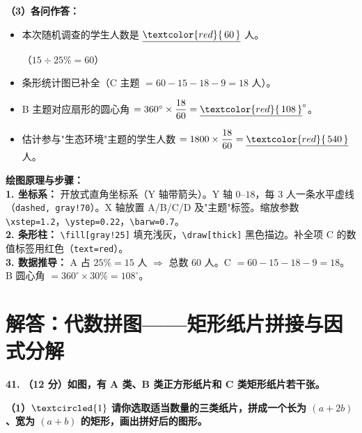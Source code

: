 \documentclass[12pt, a4paper]{ctexrep}
\begin{document}
\vspace{0.4cm}
\textbf{（3）各问作答：}

\begin{itemize}
    \item[\textbf{(1)}] 本次随机调查的学生人数是 $\underline{\textcolor{red}{\,60\,}}$ 人。

    （$15 \div 25\% = 60$）

    \item[\textbf{(2)}] 条形统计图已补全（C 主题 $= 60 - 15 - 18 - 9 = 18$ 人）。

    \item[\textbf{(3)}] B 主题对应扇形的圆心角 $= 360^\circ \times \dfrac{18}{60} = \underline{\textcolor{red}{\,108\,}}^\circ$。

    \item[\textbf{(4)}] 估计参与"生态环境"主题的学生人数 $= 1800 \times \dfrac{18}{60} = \underline{\textcolor{red}{\,540\,}}$ 人。
\end{itemize}

\vspace{0.4cm}
{\small\color{blue!70!black}
\textbf{绘图原理与步骤：}\\
\textbf{1. 坐标系：} 开放式直角坐标系（Y 轴带箭头）。Y 轴 $0$--$18$，每 $3$ 人一条水平虚线（\texttt{dashed, gray!70}）。X 轴放置 A/B/C/D 及"主题"标签。缩放参数 \texttt{\textbackslash{}xstep=1.2}，\texttt{\textbackslash{}ystep=0.22}，\texttt{\textbackslash{}barw=0.7}。\\
\textbf{2. 条形柱：} \texttt{\textbackslash{}fill[gray!25]} 填充浅灰，\texttt{\textbackslash{}draw[thick]} 黑色描边。补全项 C 的数值标签用红色（\texttt{text=red}）。\\
\textbf{3. 数据推导：} A 占 $25\% = 15$ 人 $\Rightarrow$ 总数 $60$ 人。C $= 60 - 15 - 18 - 9 = 18$。B 圆心角 $= 360^\circ \times 30\% = 108^\circ$。
}

\newpage

\section{解答：代数拼图——矩形纸片拼接与因式分解}

\vspace{0.6cm}

\textbf{\LARGE 41.} \textbf{（12 分）如图，有 A 类、B 类正方形纸片和 C 类矩形纸片若干张。}

\textbf{（1）$\textcircled{1}$ 请你选取适当数量的三类纸片，拼成一个长为 $(a+2b)$、宽为 $(a+b)$ 的矩形，画出拼好后的图形。}
\end{document}

